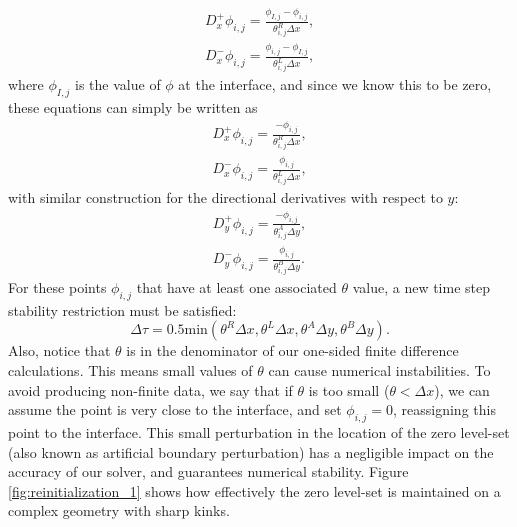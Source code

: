 \documentclass[oneside,12pt,final]{/Applications/TeX/packages/ucthesis-CA2012}
\begin{document}
\begin{mainmatter}
\begin{equation}
\begin{aligned}
D_x^+ \phi_{i,j} = \frac{\phi_{I,j}-\phi_{i,j}}{\theta^R_{i,j} \Delta x},\\
D_x^- \phi_{i,j} = \frac{\phi_{i,j}-\phi_{I,j}}{\theta^L_{i,j} \Delta x},
\end{aligned}
\end{equation}
where $\phi_{I,j}$ is the value of $\phi$ at the interface, and since we know this to be zero, these equations can simply be written as
\begin{equation}
\begin{aligned}
D_x^+ \phi_{i,j} = \frac{-\phi_{i,j}}{\theta^R_{i,j} \Delta x},\\
D_x^- \phi_{i,j} = \frac{\phi_{i,j}}{\theta^L_{i,j} \Delta x},
\end{aligned}
\end{equation}
with similar construction for the directional derivatives with respect to $y$:
\begin{equation}
\begin{aligned}
D_y^+ \phi_{i,j} = \frac{-\phi_{i,j}}{\theta^A_{i,j} \Delta y},\\
D_y^- \phi_{i,j} = \frac{\phi_{i,j}}{\theta^B_{i,j} \Delta y}.
\end{aligned}
\end{equation}
For these points $\phi_{i,j}$ that have at least one associated $\theta$ value, a new time step stability restriction must be satisfied:
\begin{equation}
\Delta \tau = 0.5\text{min}(\theta^R \Delta x, \theta^L \Delta x, \theta^A \Delta y, \theta^B \Delta y).
\end{equation}
Also, notice that $\theta$ is in the denominator of our one-sided finite difference calculations. This means small values of $\theta$ can cause numerical instabilities. To avoid producing non-finite data, we say that if $\theta$ is too small ($\theta < \Delta x$), we can assume the point is very close to the interface, and set $\phi_{i,j} = 0$, reassigning this point to the interface. This small perturbation in the location of the zero level-set (also known as artificial boundary perturbation) has a negligible impact on the accuracy of our solver, and guarantees numerical stability. Figure \ref{fig:reinitialization_1} shows how effectively the zero level-set is maintained on a complex geometry with sharp kinks.
\begin{figure} [!h]
\centering
{} \quad

\end{figure}
\end{mainmatter}
\end{document}
